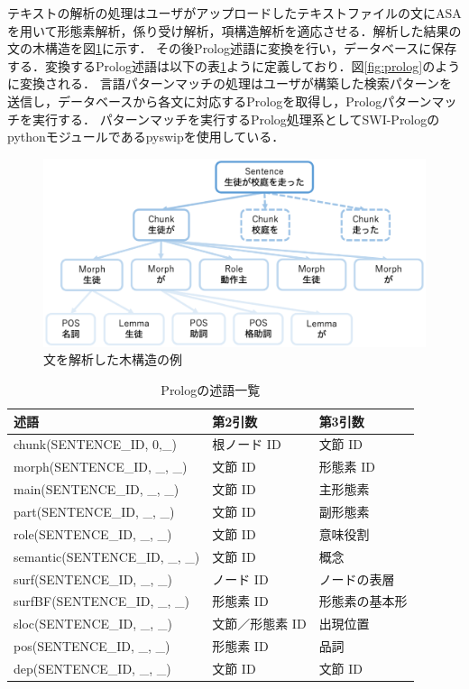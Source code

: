 \documentclass{FITpaper}
\begin{document}
テキストの解析の処理はユーザがアップロードしたテキストファイルの文にASA{}を用いて形態素解析，係り受け解析，項構造解析を適応させる．解析した結果の文の木構造を図\ref{fig:tree}に示す．
その後Prolog述語に変換を行い，データベースに保存する．変換するProlog述語は以下の表\ref{tbl:predicates}ように定義しており．図\ref{fig:prolog}のように変換される．
言語パターンマッチの処理はユーザが構築した検索パターンを送信し，データベースから各文に対応するPrologを取得し，Prologパターンマッチを実行する．
パターンマッチを実行するProlog処理系としてSWI-Prologのpythonモジュールであるpyswipを使用している．


\begin{figure}[htbp]
  \centering
  \includegraphics[scale=0.4]{fig/tree.eps}
  \caption{文を解析した木構造の例}
  \label{fig:tree}
\end{figure}
\begin{table}[htbp]
  \caption{Prologの述語一覧}
  {\small
  \begin{center}
    \begin{tabular}{|l||l|l|}\hline
      述語                         &  第2引数   & 第3引数               \\
      \hline 

      chunk(SENTENCE\_ID, 0,\_)           &  根ノード ID& 文節 ID                   \\
      morph(SENTENCE\_ID, \_, \_)      & 文節 ID& 形態素 ID                \\
      main(SENTENCE\_ID, \_, \_)         &文節 ID & 主形態素 \\
      part(SENTENCE\_ID, \_, \_)         &文節 ID& 副形態素\\
      role(SENTENCE\_ID, \_, \_)         &文節 ID& 意味役割  \\
      semantic(SENTENCE\_ID, \_, \_)     &文節 ID & 概念\\
      surf(SENTENCE\_ID, \_, \_)          &ノード ID& ノードの表層\\               
      surfBF(SENTENCE\_ID, \_, \_)       &形態素 ID& 形態素の基本形        \\
      sloc(SENTENCE\_ID, \_, \_)&文節／形態素 ID & 出現位置\\
      pos(SENTENCE\_ID, \_, \_)          &形態素 ID& 品詞\\                                        
      dep(SENTENCE\_ID, \_, \_)        &文節 ID & 文節 ID\\
        \hline
    \end{tabular}
  
    \label{tbl:predicates}
  \end{center}
  }
\end{table}
\end{document}
